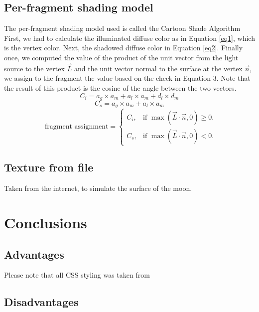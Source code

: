 \documentclass[12pt,a4paper]{article}
\begin{document}
\subsection{Per-fragment shading model}
The per-fragment shading model used is called the Cartoon Shade Algorithm \cite{shade}
First, we had to calculate the illuminated diffuse color as in Equation \ref{eq1}, which is the vertex color. Next, the shadowed diffuse color in Equation \ref{eq2}. Finally once, we computed the value of the product of the unit vector from the light source to the vertex $\overrightarrow{L}$ and the unit vector
normal to the surface at the vertex  $\overrightarrow{n}$, we assign to the fragment the value based on the check in Equation 3. Note that the result of this product is the cosine of the angle between the two vectors.
\begin{equation}\label{eq1}
C_i = a_g \times a_m + a_l \times a_m + d_l \times d_m  
\end{equation}
\begin{equation}\label{eq2}
C_s =  a_g \times a_m + a_l \times a_m
\end{equation}
\begin{equation}\label{eq3}
\text{ fragment assignment} =\begin{cases}
    C_i, & \text{if $\max(\overrightarrow{L} \cdot \overrightarrow{n}, 0)\geq0$}.\\
    C_s, & \text{if $\max(\overrightarrow{L} \cdot \overrightarrow{n}, 0)<0$}.
  \end{cases}
\end{equation}

\subsection{Texture from file}
Taken from the internet, to simulate the surface of the moon.
\section{Conclusions}

\subsection{Advantages}
%
Please note that all CSS styling was taken from \cite{css}
\subsection{Disadvantages}
\end{document}
